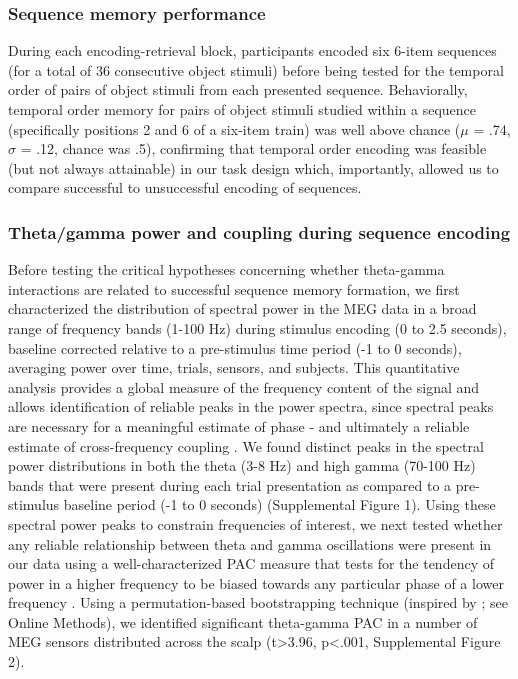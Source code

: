 \subsubsection{Sequence memory
performance}\label{sequence-memory-performance}

During each encoding-retrieval block, participants encoded six 6-item
sequences (for a total of 36 consecutive object stimuli) before being
tested for the temporal order of pairs of object stimuli from each
presented sequence. Behaviorally, temporal order memory for pairs of
object stimuli studied within a sequence (specifically positions 2 and 6
of a six-item train) was well above chance (\(\mu\) = .74, \(\sigma\) =
.12, chance was .5), confirming that temporal order encoding was
feasible (but not always attainable) in our task design which,
importantly, allowed us to compare successful to unsuccessful encoding
of sequences.

\subsubsection{Theta/gamma power and coupling during sequence
encoding}\label{thetagamma-power-and-coupling-during-sequence-encoding}

Before testing the critical hypotheses concerning whether theta-gamma
interactions are related to successful sequence memory formation, we
first characterized the distribution of spectral power in the MEG data
in a broad range of frequency bands (1-100 Hz) during stimulus encoding
(0 to 2.5 seconds), baseline corrected relative to a pre-stimulus time
period (-1 to 0 seconds), averaging power over time, trials, sensors,
and subjects. This quantitative analysis provides a global measure of
the frequency content of the signal and allows identification of
reliable peaks in the power spectra, since spectral peaks are necessary
for a meaningful estimate of phase - and ultimately a reliable estimate
of cross-frequency coupling \autocite{aru_untangling_2015}. We found
distinct peaks in the spectral power distributions in both the theta
(3-8 Hz) and high gamma (70-100 Hz) bands that were present during each
trial presentation as compared to a pre-stimulus baseline period (-1 to
0 seconds) (Supplemental Figure 1). Using these spectral power peaks to
constrain frequencies of interest, we next tested whether any reliable
relationship between theta and gamma oscillations were present in our
data using a well-characterized PAC measure that tests for the tendency
of power in a higher frequency to be biased towards any particular phase
of a lower frequency
\autocites{tort_measuring_2010}{tort_thetagamma_2009}. Using a
permutation-based bootstrapping technique (inspired by
\textcite{canolty_high_2006}; see Online Methods), we identified
significant theta-gamma PAC in a number of MEG sensors distributed
across the scalp (t\textgreater{}3.96, p\textless{}.001, Supplemental
Figure 2).

